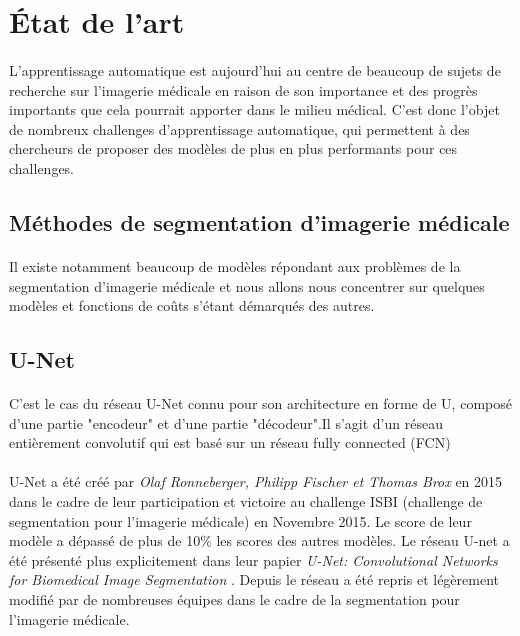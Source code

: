 \documentclass[french, english]{article}
\begin{document}
\section{État de l'art}

\paragraph{}L'apprentissage automatique est aujourd'hui au centre de beaucoup de sujets de recherche sur l'imagerie médicale en raison de son importance et des progrès importants que cela pourrait apporter dans le milieu médical. C'est donc l'objet de nombreux challenges d'apprentissage automatique, qui permettent à des chercheurs de proposer des modèles de plus en plus performants pour ces challenges.

\subsection{Méthodes de segmentation d'imagerie médicale}

\paragraph{}Il existe notamment beaucoup de modèles répondant aux problèmes de la segmentation d'imagerie médicale et nous allons nous concentrer sur quelques modèles et fonctions de coûts s'étant démarqués des autres.

\subsection{U-Net}
\paragraph{} C'est le cas du réseau U-Net connu pour son architecture en forme de U, composé d'une partie "encodeur" et d'une partie "décodeur".Il s'agit d'un réseau entièrement convolutif qui est basé sur un réseau fully connected (FCN)\paragraph{}

U-Net a été créé par \emph{Olaf Ronneberger, Philipp Fischer et Thomas Brox} en 2015 dans le cadre de leur participation et victoire au challenge ISBI (challenge de segmentation pour l'imagerie médicale) en Novembre 2015. Le score de leur modèle a dépassé de plus de 10\% les scores des autres modèles. Le réseau U-net a été présenté plus explicitement dans leur papier \emph{U-Net: Convolutional Networks for Biomedical Image Segmentation} \cite{UNet}. Depuis le réseau a été repris et légèrement modifié par de nombreuses équipes dans le cadre de la segmentation pour l'imagerie médicale.
\end{document}
